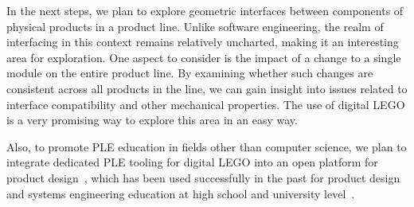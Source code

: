 \documentclass[sigconf,review]{acmart}
\begin{document}
In the next steps, we plan to explore geometric interfaces between components of physical products in a product line. Unlike software engineering, the realm of interfacing in this context remains relatively uncharted, making it an interesting area for exploration. 
One aspect to consider is the impact of a change to a single module on the entire product line. 
By examining whether such changes are consistent across all products in the line, we can gain insight into issues related to interface compatibility and other mechanical properties. 
The use of digital LEGO is a very promising way to explore this area in an easy way.

Also, to promote PLE education in fields other than computer science, we plan to integrate dedicated PLE tooling for digital LEGO into an open platform for product design~\cite{Hackenberg_2023}, which has been used successfully in the past for product design and systems engineering education at high school and university level~\cite{Hackenberg_2025}.



\end{document}
